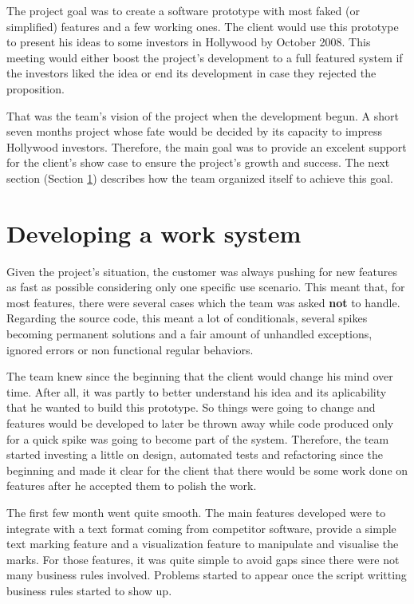 \documentclass[lnbip]{svmultln}
\begin{document}
The project goal was to create a software prototype with most faked
(or simplified) features and a few working ones. The client would use
this prototype to present his ideas to some investors in Hollywood by
October 2008. This meeting would either boost the project's
development to a full featured system if the investors liked the idea
or end its development in case they rejected the proposition.

That was the team's vision of the project when the development
begun. A short seven months project whose fate would be decided by its
capacity to impress Hollywood investors. Therefore, the main goal was
to provide an excelent support for the client's show case to ensure
the project's growth and success. The next section (Section
\ref{sec:working}) describes how the team organized itself to achieve
this goal.

\section{Developing a work system}
\label{sec:working}

Given the project's situation, the customer was always pushing for new
features as fast as possible considering only one specific use
scenario. This meant that, for most features, there were several cases
which the team was asked \textbf{not} to handle. Regarding the source
code, this meant a lot of conditionals, several spikes becoming
permanent solutions and a fair amount of unhandled exceptions, ignored
errors or non functional regular behaviors.

The team knew since the beginning that the client would change his
mind over time. After all, it was partly to better understand his idea
and its aplicability that he wanted to build this prototype. So things
were going to change and features would be developed to later be
thrown away while code produced only for a quick spike was going to
become part of the system. Therefore, the team started investing a
little on design, automated tests and refactoring since the beginning
and made it clear for the client that there would be some work done on
features after he accepted them to polish the work.

The first few month went quite smooth. The main features developed
were to integrate with a text format coming from competitor software,
provide a simple text marking feature and a visualization feature to
manipulate and visualise the marks. For those features, it was quite
simple to avoid gaps since there were not many business rules
involved. Problems started to appear once the script writting business
rules started to show up.
\end{document}
